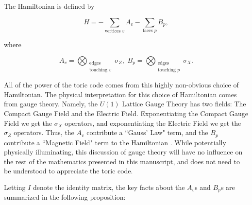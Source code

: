 \documentclass{article}
\theoremstyle{definition}
\numberwithin{figure}{section}
\begin{document}
The Hamiltonian is defined by

$$H=-\sum_{\text{vertices } v}A_v-\sum_{\text{faces } p}B_p,$$

where

$$A_v=\bigotimes_{\substack{\text{edges}\\ \text{touching }v}}\sigma_Z,\,\, B_p=\bigotimes_{\substack{\text{edges}\\ \text{touching }p}}\sigma_X.$$

All of the power of the toric code comes from this highly non-obvious choice of Hamiltonian. The physical interpretation for this choice of Hamiltonian comes from gauge theory. Namely, the $U(1)$ Lattice Gauge Theory has two fields: The Compact Gauge Field and the Electric Field. Exponentiating the Compact Gauge Field we get the $\sigma_X$ operators, and exponentiating the Electric Field we get the $\sigma_Z$ operators. Thus, the $A_v$ contribute a ``Gauss' Law" term, and the $B_p$ contribute a ``Magnetic Field" term to the Hamiltonian \cite{oh2022rank}. While potentially physically illuminating, this discussion of gauge theory will have no influence on the rest of the mathematics presented in this manuscript, and does not need to be understood to appreciate the toric code.

Letting $I$ denote the identity matrix, the key facts about the $A_v$s and $B_p$s are summarized in the following proposition:
\end{document}
